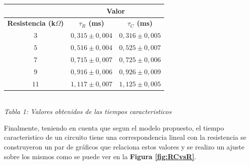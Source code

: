 \documentclass[11pt,a4paper]{article}
\begin{document}
\begin{center}
\begin{tabular}{||c|c|c||}
\hline
& \multicolumn{2}{c||}{\textbf{Valor}} \\ \hline
\textbf{Resistencia (k$\Omega$)} & \textbf{$\tau_{R}$ (ms)} & \textbf{$\tau_{C}$ (ms)} \\ \hline 
$3$ & $0,315 \pm 0,004$ & $0,316 \pm 0,005$ \\ \hline 
$5$ & $0,516\pm 0,004$ & $0,525 \pm 0,007$ \\ \hline 
$7$ & $0,715\pm 0,007$ & $0,725\pm 0,006$ \\ \hline 
$9$ & $0,916 \pm 0,006$ & $0,926 \pm 0,009$ \\ \hline 
$11$ & $1,117\pm 0,007$ & $1,125\pm 0,005$ \\ \hline 
\end{tabular}\\[0.3cm]
 
\textit{Tabla 1: Valores obtenidos de las tiempos caracteristicos}
\end{center}

Finalmente, teniendo en cuenta que segun el modelo propuesto, el tiempo caracteristico de un circuito tiene una correspondencia lineal con la resistencia se construyeron un par de gráficos que relaciona estos valores y se realizo un ajuste sobre los mismos como se puede ver en la \textbf{Figura \ref{fig:RCvsR}}.
\end{document}
